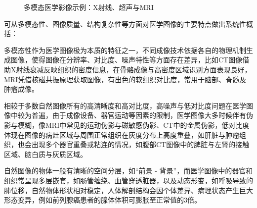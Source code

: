 \begin{figure}[htbp]
    \centering
    \hspace{0.7cm}
    \hspace{0.7cm}
    \caption{多模态医学影像示例：X射线、超声与MRI}
    \label{fig:medical_fig}
\end{figure}

可从多模态性、图像质量、结构复杂性等方面对医学图像的主要特点做出系统性概括：

多模态性作为医学图像极为本质的特征之一，不同成像技术依据各自的物理机制生成图像，使得图像在分辨率、对比度、噪声特性等方面存在差异，比如CT图像借助X射线衰减反映组织的密度信息，在骨骼成像与高密度区域识别方面表现良好，MRI凭借核磁共振原理获取图像，有出色的软组织对比度，常用于脑部、脊髓及肿瘤成像。

相较于多数自然图像所有的高清晰度和高对比度，高噪声与低对比度问题在医学图像中较为普遍，由于成像设备、器官运动等因素的限制，医学图像大多时候伴有伪影与模糊，像MRI中常见的运动伪影与磁敏感伪影、CT中的金属伪影，低对比度体现在图像的病灶区域与周围正常组织在灰度分布上高度重叠，如肝脏与肿瘤组织，也会出现多个器官重叠或粘连的情况，如腹部CT图像中的脾脏与左肾的接触区域、脑白质与灰质区域。

自然图像的物体一般有清晰的空间分层，如“前景 - 背景”，而医学图像中的器官和组织常呈现多层嵌套，如肠管缠绕、血管穿透脏器，以及动态形变，如呼吸导致的肺位移，自然物体形状相对稳定，人体解剖结构会因个体差异、病理状态产生巨大形态变异，例如前列腺癌患者的腺体体积可膨胀至正常值的3倍。
    
